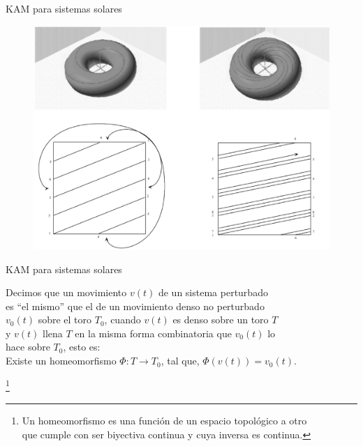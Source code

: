 \documentclass[8pt]{beamer}
\renewcommand{\>}{\rangle}
\newcommand{\<}{\langle}
\begin{document}
\begin{frame}{KAM para sistemas solares}
\vspace{-0.0cm}

\begin{figure}[h]
\centering
\includegraphics[scale=0.2]{comb.eps}
\end{figure}

\end{frame}

\begin{frame}{KAM para sistemas solares}
\vspace{-0.0cm}

\begin{mygreenbox}{}
\centering
Decimos que un movimiento $v(t)$ de un sistema perturbado\\[5pt] es ``el mismo'' que el de un movimiento denso no perturbado\\[5pt] $v_{0}(t)$ sobre el toro $T_{0}$, cuando $v(t)$ es denso sobre un toro $T$\\[5pt] \hspace{-0.3cm} y $v(t)$ llena $T$ en la misma forma combinatoria que $v_{0}(t)$ lo\\[5pt] \hspace{-4.7cm} hace sobre $T_{0}$, esto es: \\[5pt]
Existe un homeomorfismo $\Phi:T \rightarrow T_{0}$, tal que, $\Phi(v(t)) = v_{0}(t)$.
\end{mygreenbox}

\footnote{Un homeomorfismo es una función de un espacio topológico a otro\\ que cumple con ser biyectiva continua y cuya inversa es continua.} 
\end{frame}
\end{document}
